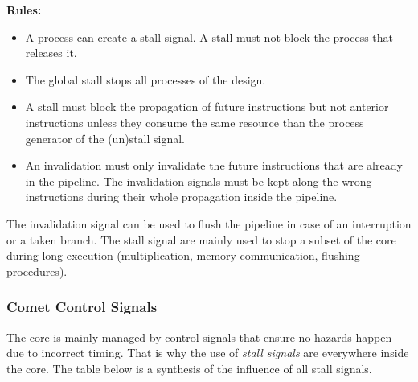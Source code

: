 \documentclass[10pt,letterpaper]{article}
\begin{document}
\textbf{Rules:}
 \begin{itemize}
     \item A process can create a stall signal. A stall must not block the process that releases it.
     \item The global stall stops all processes of the design.
     \item A stall must block the propagation of future instructions but not anterior instructions unless they consume the same resource than the process generator of the (un)stall signal.
     \item An invalidation must only invalidate the future instructions that are already in the pipeline. The invalidation signals must be kept along the wrong instructions during their whole propagation inside the pipeline.
 \end{itemize}
 
 The invalidation signal can be used to flush the pipeline in case of an interruption or a taken branch. The stall signal are mainly used to stop a subset of the core during long execution (multiplication, memory communication, flushing procedures).

\subsubsection{Comet Control Signals}
 The core is mainly managed by control signals that ensure no hazards happen due to incorrect timing. That is why the use of \textit{stall signals} are everywhere inside the core. The table below is a synthesis of the influence of all stall signals.
 
\end{document}
